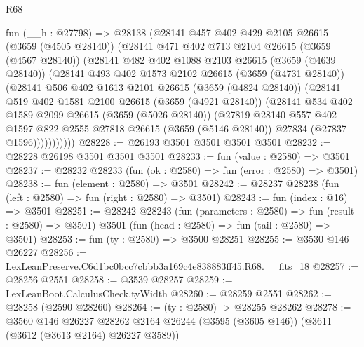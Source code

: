 \begin{lexlean}{R68}
\begin{coremodule}
      fun (__h : @27798) =>
      @28138
        (@28141
          @457
          @402
          @429
          @2105
          @26615
          (@3659 (@4505 @28140))
          (@28141
            @471
            @402
            @713
            @2104
            @26615
            (@3659 (@4567 @28140))
            (@28141
              @482
              @402
              @1088
              @2103
              @26615
              (@3659 (@4639 @28140))
              (@28141
                @493
                @402
                @1573
                @2102
                @26615
                (@3659 (@4731 @28140))
                (@28141
                  @506
                  @402
                  @1613
                  @2101
                  @26615
                  (@3659 (@4824 @28140))
                  (@28141
                    @519
                    @402
                    @1581
                    @2100
                    @26615
                    (@3659 (@4921 @28140))
                    (@28141
                      @534
                      @402
                      @1589
                      @2099
                      @26615
                      (@3659 (@5026 @28140))
                      (@27819
                        @28140
                        @557
                        @402
                        @1597
                        @822
                        @2555
                        @27818
                        @26615
                        (@3659 (@5146 @28140))
                        @27834
                        (@27837 @1596)))))))))))
@28228 := @26193 @3501 @3501 @3501 @3501
@28232 := @28228 @26198 @3501 @3501 @3501
@28233 := fun (value : @2580) => @3501
@28237 := @28232 @28233 (fun (ok : @2580) => fun (error : @2580) => @3501)
@28238 := fun (element : @2580) => @3501
@28242 := @28237 @28238 (fun (left : @2580) => fun (right : @2580) => @3501)
@28243 := fun (index : @16) => @3501
@28251 := @28242
    @28243
    (fun (parameters : @2580) => fun (result : @2580) => @3501)
    @3501
    (fun (head : @2580) => fun (tail : @2580) => @3501)
@28253 := fun (ty : @2580) => @3500 @28251
@28255 := @3530 @146 @26227
@28256 := LexLeanPreserve.C6d1bc0bcc7cbbb3a169c4e838883ff45.R68.__fits_18
@28257 := @28256 @2551
@28258 := @3539 @28257
@28259 := LexLeanBoot.CalculusCheck.tyWidth
@28260 := @28259 @2551
@28262 := @28258 (@2590 @28260)
@28264 := (ty : @2580) -> @28255 @28262
@28278 := @3560
    @146
    @26227
    @28262
    @2164
    @26244
    (@3595 (@3605 @146))
    (@3611 (@3612 (@3613 @2164) @26227 @3589))

\end{coremodule}
\end{lexlean}
